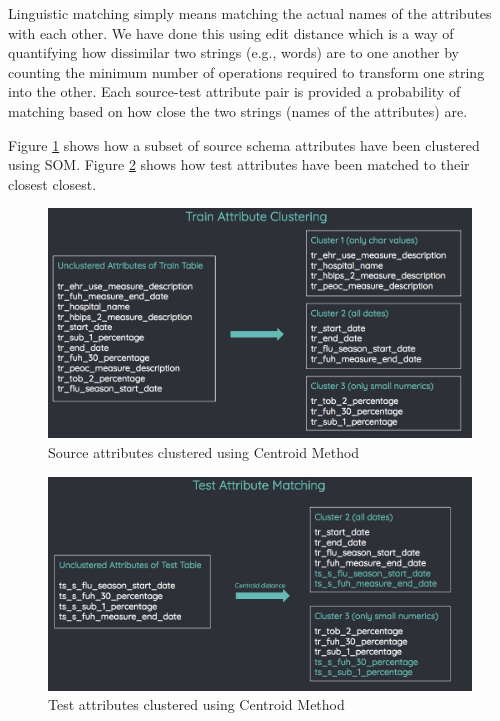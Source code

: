 \documentclass[conference]{IEEEtran}
\begin{document}
Linguistic matching simply means matching the actual names of the attributes with each other. We have done this using edit distance which is a way of quantifying how dissimilar two strings (e.g., words) are to one another by counting the minimum number of operations required to transform one string into the other. Each source-test attribute pair is provided a probability of matching based on how close the two strings (names of the attributes) are.

Figure \ref{train_centroid} shows how a subset of source schema attributes have been clustered using SOM. Figure \ref{test_centroid} shows how test attributes have been matched to their closest closest.

\begin{figure}[h]
\centering
\includegraphics[scale=0.25]{tr.jpeg}
\caption{Source attributes clustered using Centroid Method}
\label{train_centroid}
\end{figure}

\begin{figure}[h]
\centering
\includegraphics[scale=0.25]{test.jpeg}
\caption{Test attributes clustered using Centroid Method}
\label{test_centroid}
\end{figure}
\end{document}
